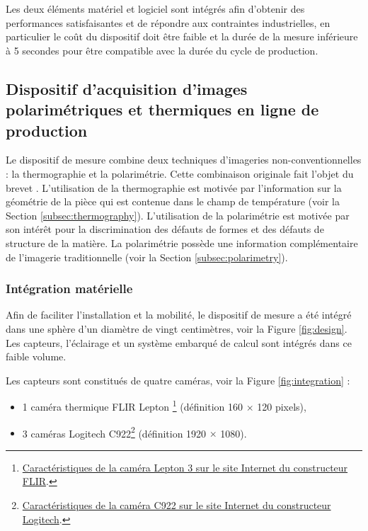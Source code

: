Les deux éléments matériel et logiciel sont intégrés afin d’obtenir des performances satisfaisantes et de répondre aux contraintes industrielles, en particulier le coût du dispositif doit être faible et la durée de la mesure inférieure à 5 secondes pour être compatible avec la durée du cycle de production.


\subsection{Dispositif d'acquisition d'images polarimétriques et thermiques en ligne de production}
Le dispositif de mesure combine deux techniques d’imageries non-conventionnelles : la thermographie et la polarimétrie.
Cette combinaison originale fait l'objet du brevet  \cite{nagorny_dispositif_2019}.
L'utilisation de la thermographie est motivée par l'information sur la géométrie de la pièce qui est contenue dans le champ de température (voir la Section \ref{subsec:thermography}).
L'utilisation de la polarimétrie est motivée par son intérêt pour la discrimination des défauts de formes et des défauts de structure de la matière.
La polarimétrie possède une information complémentaire de l'imagerie traditionnelle (voir la Section \ref{subsec:polarimetry}).


\subsubsection{Intégration matérielle}
Afin de faciliter l'installation et la mobilité, le dispositif de mesure a été intégré dans une sphère d'un diamètre de vingt centimètres, voir la Figure \ref{fig:design}.
Les capteurs, l'éclairage et un système embarqué de calcul sont intégrés dans ce faible volume.

Les capteurs sont constitués de quatre caméras, voir la Figure \ref{fig:integration} :
\begin{itemize}
	\item 1 caméra thermique FLIR Lepton \footnote{\href{https://prod.flir.fr/products/lepton/}{Caractéristiques de la caméra Lepton 3 sur le site Internet du constructeur FLIR}.} (définition 160 $\times$ 120 pixels),
	\item 3 caméras Logitech C922\footnote{\href{https://www.logitech.fr/fr-fr/product/c922-pro-stream-webcam}{Caractéristiques de la caméra C922 sur le site Internet du constructeur Logitech}.} (définition 1920 $\times$ 1080).
\end{itemize}

